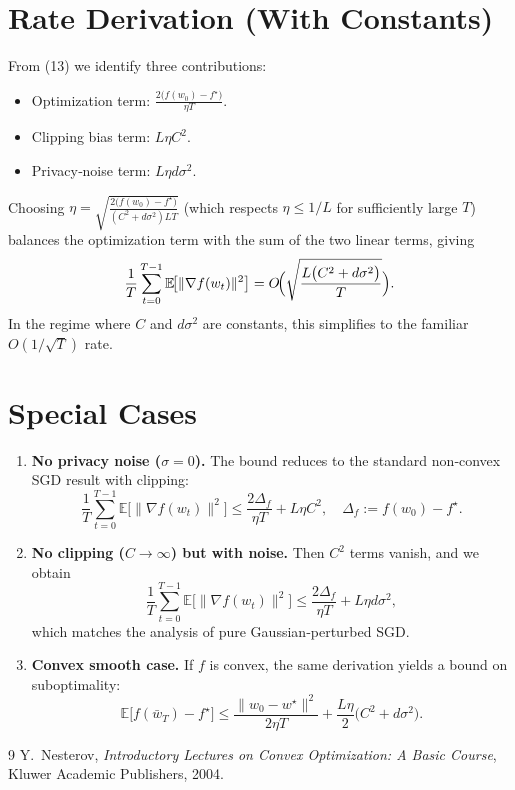 \documentclass{article}
\newcommand{\E}{\mathbb{E}}
\begin{document}
\section*{Rate Derivation (With Constants)}
From (13) we identify three contributions:
\begin{itemize}
\item Optimization term: $\displaystyle\frac{2\bigl(f(w_0)-f^\star\bigr)}{\eta T}$.
\item Clipping bias term: $L\eta C^{2}$.
\item Privacy‑noise term: $L\eta d\sigma^{2}$.
\end{itemize}
Choosing $\eta = \sqrt{\frac{2\bigl(f(w_0)-f^\star\bigr)}{(C^{2}+d\sigma^{2})LT}}$ (which respects $\eta\le 1/L$ for sufficiently large $T$) balances the optimization term with the sum of the two linear terms, giving
\[
\frac{1}{T}\sum_{t=0}^{T-1}\E\!\bigl[\|\nabla f(w_t)\|^{2}\bigr]
= O\!\Bigl(\sqrt{\frac{L\bigl(C^{2}+d\sigma^{2}\bigr)}{T}}\Bigr).
\]
In the regime where $C$ and $d\sigma^{2}$ are constants, this simplifies to the familiar $O(1/\sqrt{T})$ rate.

\section*{Special Cases}
\begin{enumerate}
\item \textbf{No privacy noise ($\sigma=0$).} The bound reduces to the standard non‑convex SGD result with clipping:
\[
\frac{1}{T}\sum_{t=0}^{T-1}\E\!\bigl[\|\nabla f(w_t)\|^{2}\bigr]
\le \frac{2\Delta_f}{\eta T}+L\eta C^{2},
\quad \Delta_f:=f(w_0)-f^\star .
\]
\item \textbf{No clipping ($C\to\infty$) but with noise.} Then $C^{2}$ terms vanish, and we obtain
\[
\frac{1}{T}\sum_{t=0}^{T-1}\E\!\bigl[\|\nabla f(w_t)\|^{2}\bigr]
\le \frac{2\Delta_f}{\eta T}+L\eta d\sigma^{2},
\]
which matches the analysis of pure Gaussian‑perturbed SGD.
\item \textbf{Convex smooth case.} If $f$ is convex, the same derivation yields a bound on suboptimality:
\[
\E\!\bigl[f(\bar w_T)-f^\star\bigr]\le
\frac{\|w_0-w^\star\|^{2}}{2\eta T}
+ \frac{L\eta}{2}\bigl(C^{2}+d\sigma^{2}\bigr).
\]
\end{enumerate}

\begin{thebibliography}{9}
Y.~Nesterov, \emph{Introductory Lectures on Convex Optimization: A Basic Course}, Kluwer Academic Publishers, 2004.
\end{thebibliography}
\end{document}
